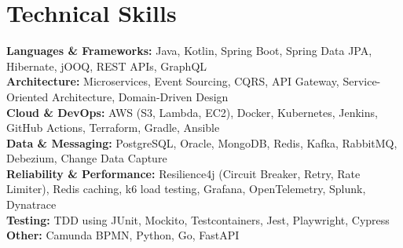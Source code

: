 \documentclass[letterpaper,11pt]{article}
\begin{document}
\section{Technical Skills}
\vspace{-2pt}
\begin{itemize}[leftmargin=0.15in, label={}]\small{\item{
\textbf{Languages \& Frameworks:} Java, Kotlin, Spring Boot, Spring Data JPA, Hibernate, jOOQ, REST APIs, GraphQL \\
\textbf{Architecture:} Microservices, Event Sourcing, CQRS, API Gateway, Service-Oriented Architecture, Domain-Driven Design \\
\textbf{Cloud \& DevOps:} AWS (S3, Lambda, EC2), Docker, Kubernetes, Jenkins, GitHub Actions, Terraform, Gradle, Ansible \\
\textbf{Data \& Messaging:} PostgreSQL, Oracle, MongoDB, Redis, Kafka, RabbitMQ, Debezium, Change Data Capture \\
\textbf{Reliability \& Performance:} Resilience4j (Circuit Breaker, Retry, Rate Limiter), Redis caching, k6 load testing, Grafana, OpenTelemetry, Splunk, Dynatrace \\
\textbf{Testing:} TDD using JUnit, Mockito, Testcontainers, Jest, Playwright, Cypress \\
\textbf{Other:} Camunda BPMN, Python, Go, FastAPI
}}
\end{itemize}
\end{document}
